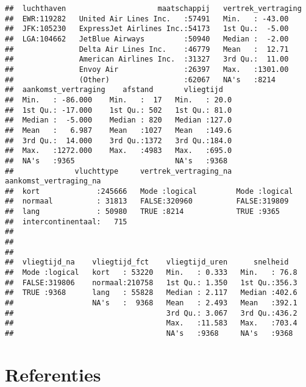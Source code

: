 \documentclass[]{memoir}
\begin{document}
\begin{verbatim}
##  luchthaven                     maatschappij   vertrek_vertraging
##  EWR:119282   United Air Lines Inc.   :57491   Min.   : -43.00   
##  JFK:105230   ExpressJet Airlines Inc.:54173   1st Qu.:  -5.00   
##  LGA:104662   JetBlue Airways         :50940   Median :  -2.00   
##               Delta Air Lines Inc.    :46779   Mean   :  12.71   
##               American Airlines Inc.  :31327   3rd Qu.:  11.00   
##               Envoy Air               :26397   Max.   :1301.00   
##               (Other)                 :62067   NA's   :8214      
##  aankomst_vertraging    afstand       vliegtijd    
##  Min.   : -86.000    Min.   :  17   Min.   : 20.0  
##  1st Qu.: -17.000    1st Qu.: 502   1st Qu.: 81.0  
##  Median :  -5.000    Median : 820   Median :127.0  
##  Mean   :   6.987    Mean   :1027   Mean   :149.6  
##  3rd Qu.:  14.000    3rd Qu.:1372   3rd Qu.:184.0  
##  Max.   :1272.000    Max.   :4983   Max.   :695.0  
##  NA's   :9365                       NA's   :9368   
##              vluchttype     vertrek_vertraging_na aankomst_vertraging_na
##  kort             :245666   Mode :logical         Mode :logical         
##  normaal          : 31813   FALSE:320960          FALSE:319809          
##  lang             : 50980   TRUE :8214            TRUE :9365            
##  intercontinentaal:   715                                               
##                                                                         
##                                                                         
##                                                                         
##  vliegtijd_na    vliegtijd_fct    vliegtijd_uren      snelheid    
##  Mode :logical   kort   : 53220   Min.   : 0.333   Min.   : 76.8  
##  FALSE:319806    normaal:210758   1st Qu.: 1.350   1st Qu.:356.3  
##  TRUE :9368      lang   : 55828   Median : 2.117   Median :402.6  
##                  NA's   :  9368   Mean   : 2.493   Mean   :392.1  
##                                   3rd Qu.: 3.067   3rd Qu.:436.2  
##                                   Max.   :11.583   Max.   :703.4  
##                                   NA's   :9368     NA's   :9368
\end{verbatim}

\section*{Referenties}\label{referenties-3}
\end{document}
